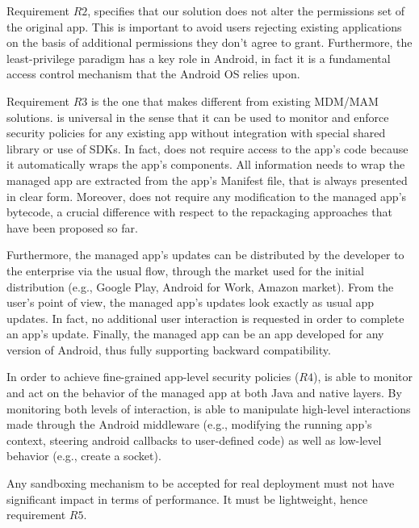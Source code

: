 Requirement $R2$, specifies that our solution does not alter the permissions set of the original app. This is important to avoid users rejecting existing applications on the basis of additional permissions they don't agree to grant.  Furthermore, the least-privilege paradigm has a key role in Android, in fact it is a fundamental access control mechanism that the Android OS relies upon.

Requirement $R3$ is the one that makes  \asd  different from  existing  MDM/MAM solutions.
\asd is universal in the sense that it can be used to monitor and enforce security policies for any existing app without integration with special shared library or use of SDKs. In fact, \asd does not require  access to the app's code because it automatically wraps the app's components. All information \asd needs to wrap the managed app are extracted from the app's Manifest file, that is always presented in clear form. Moreover, \asd does not require any modification to the managed app's bytecode, a crucial difference with respect to the repackaging approaches that have been proposed so far.

Furthermore, the managed app's updates can be distributed by the developer to the enterprise via the usual flow, through the market used for the initial distribution (e.g., Google Play, Android for Work, Amazon market). From the user's point of view, the managed app's updates look exactly as usual app updates. In fact, no additional user interaction is requested in order to complete an app's update. Finally, the managed app can be an app developed for any version of Android, thus fully supporting  backward compatibility.

In order to achieve fine-grained app-level security policies ($R4$), \asd is able to monitor and act on  the behavior of the managed app at both Java and native layers. By monitoring both levels of interaction, \asd is able to manipulate high-level interactions made through the Android middleware (e.g., modifying the running app's context, steering android callbacks to user-defined code) as well as low-level behavior (e.g., create a socket). 

Any sandboxing mechanism to be accepted for real deployment must not have significant impact in terms of performance. It must be lightweight, hence requirement $R5$.  
